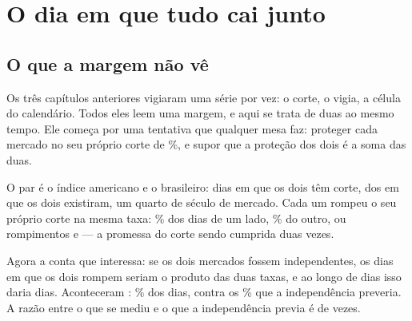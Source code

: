 %
%
%

\chapter{O dia em que tudo cai junto}
\label{cap:dependencia}

\section{O que a margem não vê}

Os três capítulos anteriores vigiaram uma série por vez: o corte, o vigia, a célula do
calendário. Todos eles leem uma margem, e aqui se trata de duas ao mesmo tempo. Ele começa por uma
tentativa que qualquer mesa faz: proteger cada mercado no seu próprio corte de
\numPromessaPct\%, e supor que a proteção dos dois é a soma das duas.

O par é o índice americano e o brasileiro: \numDependenciaDias{} dias em que os dois têm
corte, dos \numPedacoDiasComuns{} em que os dois existiram, um quarto de século de mercado. Cada um rompeu o seu próprio corte na mesma taxa: \numDependenciaTaxaAPct\% dos dias de um
lado, \numDependenciaTaxaBPct\% do outro, ou \numDependenciaRompeA{} rompimentos e
\numDependenciaRompeB{} --- a promessa do corte sendo cumprida duas vezes.

Agora a conta que interessa: se os dois mercados fossem independentes, os dias em que os dois
rompem seriam o produto das duas taxas, e ao longo de \numDependenciaDias{} dias isso daria
\numDependenciaEsperadoDias{} dias. Aconteceram \numDependenciaJuntos: \numDependenciaJuntosPct\%
dos dias, contra os \numDependenciaEsperadoPct\% que a independência preveria. A razão entre o que se mediu e o que a independência previa é de \numDependenciaExcesso{} vezes.

